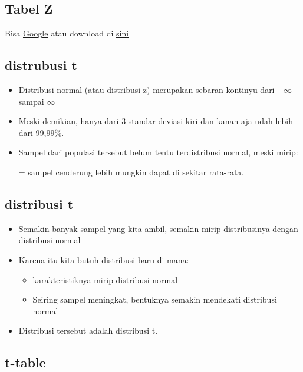 \documentclass[
  letterpaper,
  DIV=11,
  numbers=noendperiod]{scrartcl}
\begin{document}
\subsection{Tabel Z}\label{tabel-z}

Bisa
\href{https://www.google.com/search?client=firefox-b-d&q=z+score+table}{Google}
atau download di
\href{https://drive.google.com/file/d/1ywI58hnM8p0ZyFV7B9rCOosk72iCGguq/view?usp=sharing}{sini}

\subsection{distrubusi t}\label{distrubusi-t}

\begin{itemize}
\item
  Distribusi normal (atau distribusi z) merupakan sebaran kontinyu dari
  \(-\infty\) sampai \(\infty\)
\item
  Meski demikian, hanya dari 3 standar deviasi kiri dan kanan aja udah
  lebih dari 99,99\%.
\item
  Sampel dari populasi tersebut belum tentu terdistribusi normal, meski
  mirip:

  = sampel cenderung lebih mungkin dapat di sekitar rata-rata.
\end{itemize}

\subsection{distribusi t}\label{distribusi-t}

\begin{itemize}
\item
  Semakin banyak sampel yang kita ambil, semakin mirip distribusinya
  dengan distribusi normal
\item
  Karena itu kita butuh distribusi baru di mana:

  \begin{itemize}
  \item
    karakteristiknya mirip distribusi normal
  \item
    Seiring sampel meningkat, bentuknya semakin mendekati distribusi
    normal
  \end{itemize}
\item
  Distribusi tersebut adalah distribusi t.
\end{itemize}

\subsection{t-table}\label{t-table}
\end{document}
